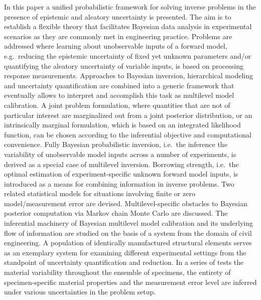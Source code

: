 In this paper a unified probabilistic framework for solving inverse problems in the presence of epistemic and aleatory uncertainty is presented.
The aim is to establish a flexible theory that facilitates Bayesian data analysis in experimental scenarios as they are commonly met in engineering practice.
Problems are addressed where learning about unobservable inputs of a forward model,
e.g.\ reducing the epistemic uncertainty of fixed yet unknown parameters and/or quantifying the aleatory uncertainty of variable inputs,
is based on processing response measurements.
Approaches to Bayesian inversion, hierarchical modeling and uncertainty quantification are combined into a generic framework
that eventually allows to interpret and accomplish this task as multilevel model calibration.
A joint problem formulation, where quantities that are not of particular interest are marginalized out from a joint posterior distribution,
or an intrinsically marginal formulation, which is based on an integrated likelihood function,
can be chosen according to the inferential objective and computational convenience.
Fully Bayesian probabilistic inversion, i.e.\ the inference the variability of unobservable model inputs across a number of experiments, is derived as a special case of multilevel inversion.
Borrowing strength, i.e.\ the optimal estimation of experiment-specific unknown forward model inputs, is introduced as a means for combining information in inverse problems.
Two related statistical models for situations involving finite or zero model/measurement error are devised.
Multilevel-specific obstacles to Bayesian posterior computation via Markov chain Monte Carlo are discussed.
The inferential machinery of Bayesian multilevel model calibration and its underlying flow of information are studied on the basis of a system from the domain of civil engineering.
A population of identically manufactured structural elements serves as an exemplary system for examining different experimental settings from the standpoint of uncertainty quantification and reduction.
In a series of tests the material variability throughout the ensemble of specimens, the entirety of specimen-specific material properties
and the measurement error level are inferred under various uncertainties in the problem setup.